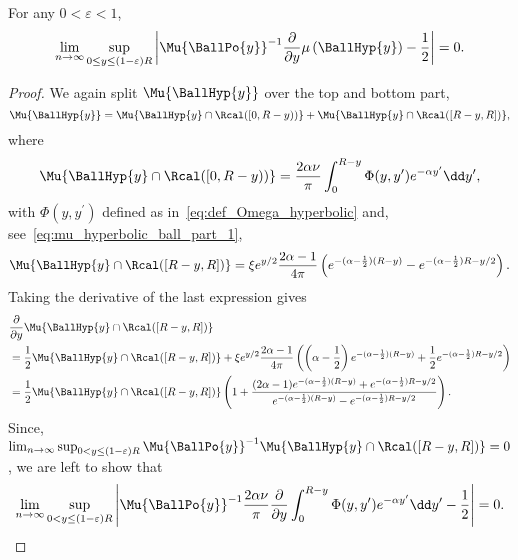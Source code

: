 \begin{lemma}
For any $0 < \varepsilon < 1$,
\[
	\lim_{n \to \infty} \sup_{0 \le y \le (1-\varepsilon)R} \left|\Mu{\BallPo{y}}^{-1}
	\frac{\partial}{\partial y} \mu\left(\BallHyp{y}\right) - \frac{1}{2}\right| = 0.
\]
\end{lemma}

\begin{proof}
We again split $\Mu{\BallHyp{y}}$ over the top and bottom part,
\[
	\Mu{\BallHyp{y}} 
	= \Mu{\BallHyp{y} \cap \Rcal ([0,R - y))} + \Mu{\BallHyp{y} \cap \Rcal ([R - y, R])},
\]
where
\[
	\Mu{\BallHyp{y} \cap \Rcal ([0,R - y))} = \frac{2\alpha \nu}{\pi}\int_0^{R - y} \Phi(y,y^\prime) 
		e^{-\alpha y^\prime} \dd y^\prime,
\]
with $\Phi(y,y^\prime)$ defined as in~\eqref{eq:def_Omega_hyperbolic} and, see~\eqref{eq:mu_hyperbolic_ball_part_1},
\[
	\Mu{\BallHyp{y} \cap \Rcal ([R - y, R])}
	= \xi e^{y/2}\frac{2\alpha - 1}{4\pi} \left( e^{-(\alpha - \frac{1}{2})(R - y)}
	- e^{-(\alpha - \frac{1}{2})R - y/2}\right).
\]
Taking the derivative of the last expression gives
\begin{align*}
	&\frac{\partial}{\partial y} \Mu{\BallHyp{y} \cap \Rcal ([R - y, R])}\\
	&= \frac{1}{2}\Mu{\BallHyp{y} \cap \Rcal ([R - y, R])}
		+ \xi e^{y/2}\frac{2\alpha - 1}{4\pi}\left(
		\left(\alpha - \frac{1}{2}\right)e^{-(\alpha - \frac{1}{2})(R - y)} 
		+ \frac{1}{2}e^{-(\alpha - \frac{1}{2})R - y/2}\right)\\
	&= \frac{1}{2}\Mu{\BallHyp{y} \cap \Rcal ([R - y, R])}\left(1 +
		\frac{(2\alpha - 1)e^{-(\alpha - \frac{1}{2})(R - y)} + e^{-(\alpha - \frac{1}{2})R - y/2}}
		{e^{-(\alpha - \frac{1}{2})(R - y)} - e^{-(\alpha - \frac{1}{2})R - y/2}}\right).
\end{align*}
Since, $\lim_{n \to \infty} \sup_{0 < y \le (1-\varepsilon)R} \Mu{\BallPo{y}}^{-1} \Mu{\BallHyp{y} \cap \Rcal ([R - y, R])} = 0$, we are left to show that
\begin{equation}\label{eq:derivative_mu_hyp_ball_main}
	\lim_{n \to \infty} \sup_{0 < y \le (1-\varepsilon)R} \left|\Mu{\BallPo{y}}^{-1} \frac{2\alpha \nu}{\pi} \frac{\partial}{\partial y} \int_0^{R - y} \Phi(y,y^\prime) e^{-\alpha y^\prime} \dd y^\prime
	- \frac{1}{2}\right| = 0.
\end{equation}


\end{proof}
